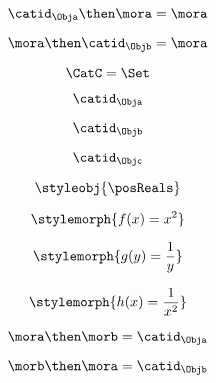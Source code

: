 {\begin{forslides}
        \begin{equation}
            \label{eq:21}
            \catid_{\Obja} \then \mora = \mora
        \end{equation}

        \begin{equation}
            \label{eq:22}
            \mora \then \catid_{\Objb} = \mora
        \end{equation}

        \begin{equation}
            \label{eq:23}
            \CatC = \Set
        \end{equation}

        \begin{equation}
            \label{eq:24}
            \catid_{\Obja}
        \end{equation}

        \begin{equation}
            \label{eq:25}
            \catid_{\Objb}
        \end{equation}

        \begin{equation}
            \label{eq:26}
            \catid_{\Objc}
        \end{equation}

        \begin{equation}
            \label{eq:27}
            \styleobj{\posReals}
        \end{equation}

        \begin{equation}
            \label{eq:28}
            \stylemorph{f(x) = x^2}
        \end{equation}

        \begin{equation}
            \label{eq:29}
            \stylemorph{g(y) = \frac{1}{y}}
        \end{equation}

        \begin{equation}
            \label{eq:30}
            \stylemorph{h(x) = \frac{1}{x^2}}
        \end{equation}

        \begin{equation}
            \label{eq:31}
            \mora \then \morb = \catid_\Obja
        \end{equation}

        \begin{equation}
            \label{eq:32}
            \morb \then \mora = \catid_\Objb
        \end{equation}


\end{forslides}}

